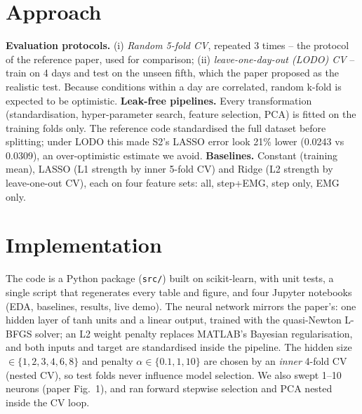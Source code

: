 \documentclass[10pt,twocolumn]{article}
\begin{document}
\section{Approach}
\textbf{Evaluation protocols.} (i) \emph{Random 5-fold CV}, repeated 3 times -- the protocol of
the reference paper, used for comparison; (ii) \emph{leave-one-day-out (LODO) CV} -- train on 4
days and test on the unseen fifth, which the paper proposed as the realistic test. Because
conditions within a day are correlated, random k-fold is expected to be optimistic.
\textbf{Leak-free pipelines.} Every transformation (standardisation, hyper-parameter search,
feature selection, PCA) is fitted on the training folds only. The reference code standardised the
full dataset before splitting; under LODO this made S2's LASSO error look 21\% lower
(0.0243 vs 0.0309), an over-optimistic estimate we avoid.
\textbf{Baselines.} Constant (training mean), LASSO (L1 strength by inner 5-fold CV) and Ridge
(L2 strength by leave-one-out CV), each on four feature sets: all, step+EMG, step only, EMG only.

\section{Implementation}
The code is a Python package (\texttt{src/}) built on scikit-learn, with unit tests, a single
script that regenerates every table and figure, and four Jupyter notebooks (EDA, baselines,
results, live demo). The neural network mirrors the paper's: one hidden layer of tanh units and a
linear output, trained with the quasi-Newton L-BFGS solver; an L2 weight penalty replaces
MATLAB's Bayesian regularisation, and both inputs and target are standardised inside the pipeline.
The hidden size $\in\{1,2,3,4,6,8\}$ and penalty $\alpha\in\{0.1,1,10\}$ are chosen by an
\emph{inner} 4-fold CV (nested CV), so test folds never influence model selection. We also swept
1--10 neurons (paper Fig.~1), and ran forward stepwise selection and PCA nested inside the CV loop.
\end{document}

